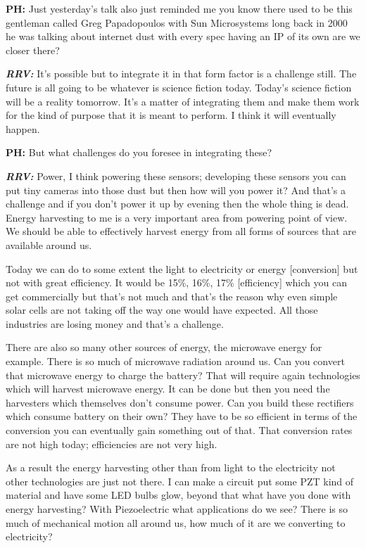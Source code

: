 \textbf{PH:} Just yesterday’s talk also just reminded me you know there used to be this gentleman called Greg Papadopoulos with Sun Microsystems long back in 2000 he was talking about internet dust with every spec having an IP of its own are we closer there? 

\textbf{\textit{RRV:}} It’s possible but to integrate it in that form factor is a challenge still. The future is all going to be whatever is science fiction today. Today’s science fiction will be a reality tomorrow. It’s a matter of integrating them and make them work for the kind of purpose that it is meant to perform. I think it will eventually happen.

\textbf{PH:} But what challenges do you foresee in integrating these? 

\textbf{\textit{RRV:}} Power, I think powering these sensors; developing these sensors you can put tiny cameras into those dust but then how will you power it? And that’s a challenge and if you don’t power it up by evening then the whole thing is dead. Energy harvesting to me is a very important area from powering point of view. We should be able to effectively harvest energy from all forms of sources that are available around us.

Today we can do to some extent the light to electricity or energy [conversion] but not with great efficiency. It would be 15\%, 16\%, 17\% [efficiency] which you can get commercially but that’s not much and that’s the reason why even simple solar cells are not taking off the way one would have expected. All those industries are losing money and that’s a challenge.

There are also so many other sources of energy, the microwave energy for example. There is so much of microwave radiation around us. Can you convert that microwave energy to charge the battery? That will require again technologies which will harvest microwave energy. It can be done but then you need the harvesters which themselves don’t consume power. Can you build these rectifiers which consume battery on their own? They have to be so efficient in terms of the conversion you can eventually gain something out of that. That conversion rates are not high today; efficiencies are not very high. 

As a result the energy harvesting other than from light to the electricity not other technologies are just not there. I can make a circuit put some PZT kind of material and have some LED bulbs glow, beyond that what have you done with energy harvesting? With Piezoelectric what applications do we see? There is so much of mechanical motion all around us, how much of it are we converting to electricity?

